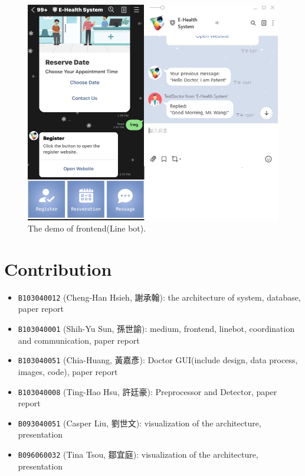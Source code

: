 \documentclass{article}
\begin{document}
\begin{figure}[ht]
  \centering
  \includegraphics[scale = 0.5]{asset/frontend_and_medium/linebot2.png}
  \caption{The demo of frontend(Line bot).}
  \label{fig:linebot_msg}
\end{figure}

\section{Contribution}
\label{sec:contribution}

\begin{itemize}
  \item \texttt{B103040012} (Cheng-Han Hsieh, 謝承翰): the architecture of system, database, paper report
  \item \texttt{B103040001} (Shih-Yu Sun, 孫世諭): medium, frontend, linebot, coordination and communication, paper report
  \item \texttt{B103040051} (Chia-Huang, 黃嘉彥): Doctor GUI(include design, data process, images, code), paper report
  \item \texttt{B103040008} (Ting-Hao Hsu, 許廷豪): Preprocessor and Detector, paper report
  \item \texttt{B093040051} (Casper Liu, 劉世文): visualization of the architecture, presentation
  \item \texttt{B096060032} (Tina Tsou, 鄒宜庭): visualization of the architecture, presentation
\end{itemize}
\end{document}
